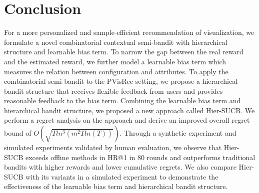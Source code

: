 
\section{Conclusion}
For a more personalized and sample-efficient recommendation of visualization, we formulate a novel combinatorial contextual semi-bandit with hierarchical structure and learnable bias term. 
To narrow the gap between the real reward and the estimated reward, we further model a learnable bias term which measures the relation between configuration and attributes. To apply the combinatorial semi-bandit to the PVisRec setting, we propose a hierarchical bandit structure that receives flexible feedback from users and provides reasonable feedback to the bias term. Combining the learnable bias term and hierarchical bandit structure, we proposed a new approach called Hier-SUCB. We perform a regret analysis on the approach and derive an improved overall regret bound of $O(\sqrt{Tln^3(m^2T ln(T))})$. Through a synthetic experiment and simulated experiments validated by human evaluation, we observe that Hier-SUCB exceeds offline methods in HR@1 in 80 rounds and outperforms traditional bandits with higher rewards and lower cumulative regrets. We also compare Hier-SUCB with its variants in a simulated experiment to demonstrate the effectiveness of the learnable bias term and hierarchical bandit structure.
